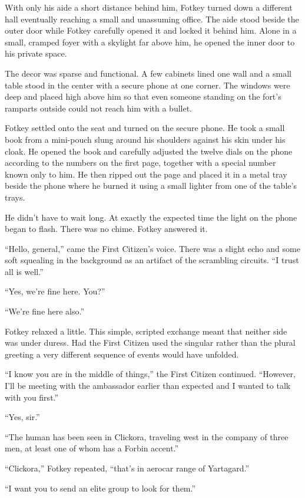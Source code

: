 With only his aide a short distance behind him, Fotkey turned down a different hall eventually
reaching a small and unassuming office. The aide stood beside the outer door while Fotkey
carefully opened it and locked it behind him. Alone in a small, cramped foyer with a skylight
far above him, he opened the inner door to his private space.

The decor was sparse and functional. A few cabinets lined one wall and a small table stood in
the center with a secure phone at one corner. The windows were deep and placed high above him so
that even someone standing on the fort's ramparts outside could not reach him with a bullet.

Fotkey settled onto the seat and turned on the secure phone. He took a small book from a
mini-pouch slung around his shoulders against his skin under his cloak. He opened the book and
carefully adjusted the twelve dials on the phone according to the numbers on the first page,
together with a special number known only to him. He then ripped out the page and placed it in a
metal tray beside the phone where he burned it using a small lighter from one of the table's
trays.

He didn't have to wait long. At exactly the expected time the light on the phone began to flash.
There was no chime. Fotkey answered it.

``Hello, general,'' came the First Citizen's voice. There was a slight echo and some soft
squealing in the background as an artifact of the scrambling circuits. ``I trust all is well.''

``Yes, we're fine here. You?''

``We're fine here also.''

Fotkey relaxed a little. This simple, scripted exchange meant that neither side was under
duress. Had the First Citizen used the singular rather than the plural greeting a very different
sequence of events would have unfolded.

``I know you are in the middle of things,'' the First Citizen continued. ``However, I'll be
meeting with the ambassador earlier than expected and I wanted to talk with you first.''

``Yes, sir.''

``The human has been seen in Clickora, traveling west in the company of three men, at least one
of whom has a Forbin accent.''

``Clickora,'' Fotkey repeated, ``that's in aerocar range of Yartagard.''

``I want you to send an elite group to look for them.''

